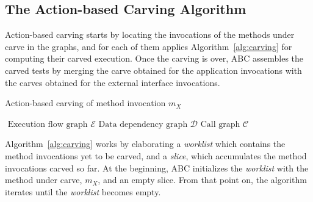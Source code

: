 \documentclass[10pt,conference]{IEEEtran}
\makeatletter
\newcommand{\algrule}[1][.2pt]{\par\vskip.5\baselineskip\hrule height #1\par\vskip.5\baselineskip}
\newcommand{\worklist}{\textit{worklist}\xspace}
\gdef\xxx{\@ifnextchar[\xxx@lab\xxx@nolab}
\newcommand{\abc}{\textsf{ABC}\xspace}
\makeatother
\begin{document}
\subsection{The Action-based Carving Algorithm}
Action-based carving starts by locating the invocations of
the methods under carve  in the graphs, and for each of them applies
Algorithm~\ref{alg:carving} for computing their carved execution.
%
Once the carving is over, \abc assembles the carved tests by merging
the carve obtained for the application invocations with the carves obtained for
the external interface invocations.

\begin{algorithm}
\caption{Action-based carving of method invocation $m_X$}\label{alg:carving}
\begin{algorithmic}
\REQUIRE$ $
\STATE$\text{Execution flow graph } \mathcal{E}$
\STATE$\text{Data dependency graph } \mathcal{D}$
\STATE$\text{Call graph } \mathcal{C}$%
\end{algorithmic}
\end{algorithm}

Algorithm~\ref{alg:carving} works by elaborating a \worklist which contains the method invocations yet to be carved,
and a \emph{slice}, which accumulates the method invocations carved so far.
At the beginning, \abc initializes the \worklist with the method under carve, $m_X$, and an empty slice.
From that point on, the algorithm iterates until the \worklist becomes empty.
\end{document}
